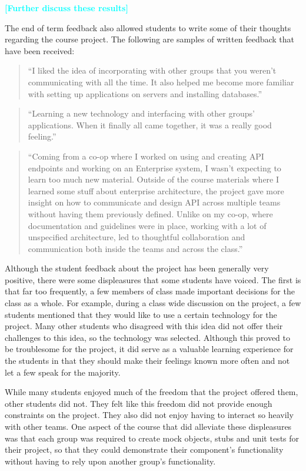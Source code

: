 \documentclass{sig-alternate-05-2015}
\newcommand{\todo}[1]{\textcolor{cyan}{\textbf{[#1]}}}
\begin{document}
\todo{Further discuss these results}





The end of term feedback also allowed students to write some of their thoughts regarding the course project. The following are samples of written feedback that have been received:
\begin{quote}
``I liked the idea of incorporating with other groups that you weren't communicating with all the time. It also helped me become more familiar with setting up applications on servers and installing databases.''
\end{quote}

\begin{quote}
``Learning a new technology and interfacing with other groups' applications. When it finally all came together, it was a really good feeling.''
\end{quote}


\begin{quote}
``Coming from a co-op where I worked on using and creating API endpoints and working on an Enterprise system, I wasn't expecting to learn too much new material. Outside of the course materials where I learned some stuff about enterprise architecture, the project gave more insight on how to communicate and design API across multiple teams without having them previously defined. Unlike on my co-op, where documentation and guidelines were in place, working with a lot of unspecified architecture, led to thoughtful collaboration and communication both inside the teams and across the class.''
\end{quote}


Although the student feedback about the project has been generally very positive, there were some displeasures that some students have voiced. The first is that far too frequently, a few members of class made important decisions for the class as a whole. For example, during a class wide discussion on the project, a few students mentioned that they would like to use a certain technology for the project. Many other students who disagreed with this idea did not offer their challenges to this idea, so the technology was selected. Although this proved to be troublesome for the project, it did serve as a valuable learning experience for the students in that they should make their feelings known more often and not let a few speak for the majority. 

While many students enjoyed much of the freedom that the project offered them, other students did not. They felt like this freedom did not provide enough constraints on the project. They also did not enjoy having to interact so heavily with other teams. One aspect of the course that did alleviate these displeasures was that each group was required to create mock objects, stubs and unit tests for their project, so that they could demonstrate their component's functionality without having to rely upon another group's functionality.
\end{document}

